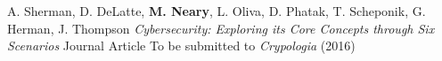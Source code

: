 \begin{cventries}
  \cventry
    {A. Sherman, D. DeLatte, \textbf{M. Neary}, L. Oliva, D. Phatak, T. Scheponik, G. Herman, J. Thompson}
    {\textit{Cybersecurity: Exploring its Core Concepts through Six Scenarios}}
    {Journal Article}
    {To be submitted to \textit{Crypologia} (2016)}
    {}
    
\end{cventries}
